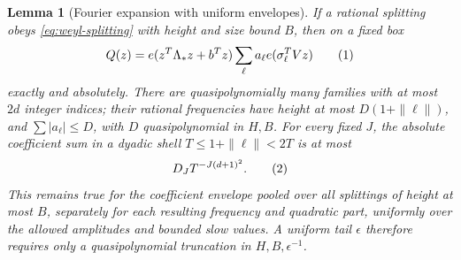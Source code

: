 \documentclass[11pt]{article}
\newtheorem{lemma}[theorem]{Lemma}
\theoremstyle{definition}
\newcommand{\eqtag}[1]{\refstepcounter{equation}\tag{\theequation}\label{#1}}
\numberwithin{equation}{section}
\begin{document}
\begin{lemma}[Fourier expansion with uniform envelopes]\label{lem:chartfourier}
If a rational splitting obeys \eqref{eq:weyl-splitting} with height and size bound $B$, then on a fixed box
\[
 Q(z)=e(z^T\Lambda_*z+b^Tz)\sum_\ell a_\ell e(\sigma_\ell^TVz)
 \eqtag{eq:chartfourier}
\]
exactly and absolutely. There are quasipolynomially many families with at most $2d$ integer indices; their rational frequencies have height at most $D(1+\|\ell\|)$, and $\sum|a_\ell|\le D$, with $D$ quasipolynomial in $H,B$. For every fixed $J$, the absolute coefficient sum in a dyadic shell $T\le1+\|\ell\|<2T$ is at most
\[
 D_JT^{-J(d+1)^2}.
 \eqtag{eq:shell}
\]
This remains true for the coefficient envelope pooled over all splittings of height at most $B$, separately for each resulting frequency and quadratic part, uniformly over the allowed amplitudes and bounded slow values. A uniform tail $\epsilon$ therefore requires only a quasipolynomial truncation in $H,B,\epsilon^{-1}$.
\end{lemma}
\end{document}

